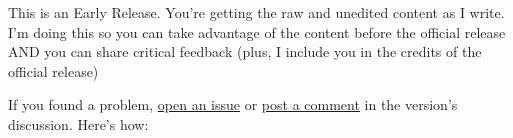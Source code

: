 \documentclass[11pt]{article}
\begin{document}
    \begin{importantblock}
        This is an Early Release. You're getting the raw and unedited content as I write. I'm doing this so you can take advantage of the content before the official release AND you can share critical feedback (plus, I include you in the credits of the official release)

        If you found a problem, \href{https://github.com/deletosh/book-CodingForBusyPros/issues}{open an issue} or \href{https://github.com/deletosh/book-CodingForBusyPros/releases}{post a comment} in the version's discussion. Here's how:

%
    \end{importantblock}
\end{document}
